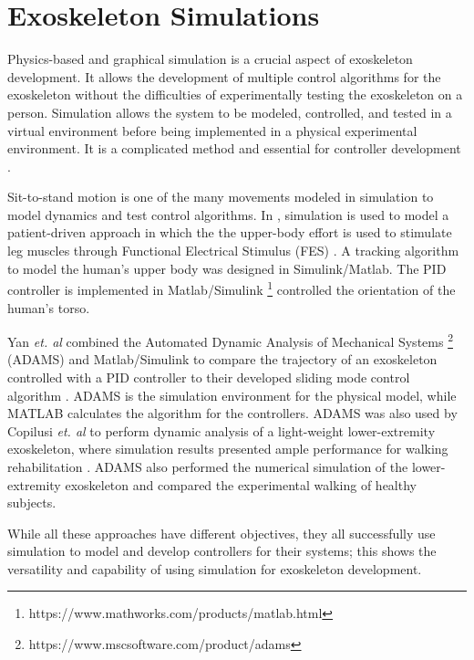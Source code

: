 \section{Exoskeleton Simulations}
Physics-based and graphical simulation is a crucial aspect of exoskeleton development. It allows the development of multiple control algorithms for the exoskeleton without the difficulties of experimentally testing the exoskeleton on a person. Simulation allows the system to be modeled, controlled, and tested in a virtual environment before being implemented in a physical experimental environment. It is a complicated method and essential for controller development \cite{ZLAJPAH2008879}.   

Sit-to-stand motion is one of the many movements modeled in simulation to model dynamics and test control algorithms. In \cite{reiner1998patient}, simulation is used to model a patient-driven approach in which the the upper-body effort is used to stimulate leg muscles through Functional Electrical Stimulus (FES) \cite{lynch2008functional} \cite{rushton1997functional}. A tracking algorithm to model the human's upper body was designed in Simulink/Matlab. The PID controller is implemented in Matlab/Simulink \footnote{https://www.mathworks.com/products/matlab.html} controlled the orientation of the human's torso. 

Yan \textit{et. al} combined the Automated Dynamic Analysis of Mechanical Systems \footnote{https://www.mscsoftware.com/product/adams} (ADAMS) and Matlab/Simulink to compare the trajectory of an exoskeleton controlled with a PID controller to their developed sliding mode control algorithm \cite{Yan_2017}. ADAMS is the simulation environment for the physical model, while MATLAB calculates the algorithm for the controllers. ADAMS was also used by Copilusi \textit{et. al} to perform dynamic analysis of a light-weight lower-extremity exoskeleton, where simulation results presented ample performance for walking rehabilitation  \cite{copilusi2014}. ADAMS also performed the numerical simulation \cite{geonea2017design} of the lower-extremity exoskeleton and compared the experimental walking of healthy subjects. 

While all these approaches have different objectives, they all successfully use simulation to model and develop controllers for their systems; this shows the versatility and capability of using simulation for exoskeleton development. 
